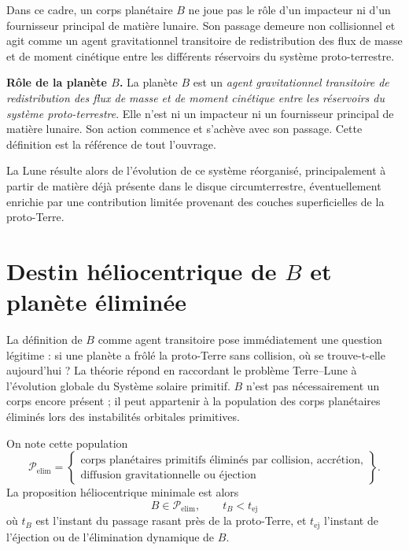 \documentclass[11pt,a4paper,openany]{report}
\begin{document}
Dans ce cadre, un corps planétaire $B$ ne joue pas le rôle d'un impacteur ni d'un fournisseur
principal de matière lunaire. Son passage demeure non collisionnel et agit comme un agent
gravitationnel transitoire de redistribution des flux de masse et de moment cinétique entre les
différents réservoirs du système proto-terrestre.

\begin{definition}
\textbf{Rôle de la planète $B$.} La planète $B$ est un \emph{agent gravitationnel transitoire de
redistribution des flux de masse et de moment cinétique entre les réservoirs du système
proto-terrestre}. Elle n'est ni un impacteur ni un fournisseur principal de matière lunaire. Son
action commence et s'achève avec son passage. Cette définition est la référence de tout
l'ouvrage.
\end{definition}

La Lune résulte alors de l'évolution de ce système réorganisé, principalement à partir de matière
déjà présente dans le disque circumterrestre, éventuellement enrichie par une contribution
limitée provenant des couches superficielles de la proto-Terre.

\section{Destin héliocentrique de \texorpdfstring{$B$}{B} et planète éliminée}
\label{sec:destinB}

La définition de $B$ comme agent transitoire pose immédiatement une question légitime : si une
planète a frôlé la proto-Terre sans collision, où se trouve-t-elle aujourd'hui ? La théorie répond en
raccordant le problème Terre--Lune à l'évolution globale du Système solaire primitif. $B$ n'est pas
nécessairement un corps encore présent ; il peut appartenir à la population des corps planétaires
éliminés lors des instabilités orbitales primitives.

On note cette population
\begin{equation}
\mathcal{P}_{\mathrm{elim}}=
\left\{\begin{array}{l}
\text{corps planétaires primitifs éliminés par collision, accrétion,}\\
\text{diffusion gravitationnelle ou éjection}
\end{array}\right\}.
\label{eq:Pelim}
\end{equation}
La proposition héliocentrique minimale est alors
\begin{equation}
\boxed{\;B\in\mathcal{P}_{\mathrm{elim}},\qquad t_B<t_{\mathrm{ej}}\;}
\label{eq:tB-tej}
\end{equation}
où $t_B$ est l'instant du passage rasant près de la proto-Terre, et $t_{\mathrm{ej}}$ l'instant de
l'éjection ou de l'élimination dynamique de $B$.
\end{document}
